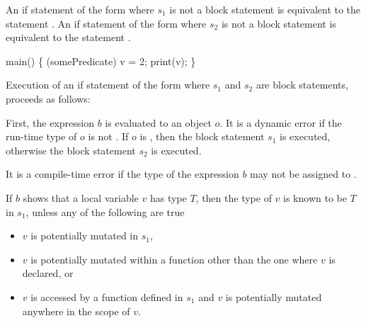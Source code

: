 \documentclass[makeidx]{article}
\begin{document}
{\LMHash{}%
An if statement of the form
where $s_1$ is not a block statement is equivalent to the statement
.
An if statement of the form
where $s_2$ is not a block statement is equivalent to the statement
.


\begin{dartCode}
\VOID{} main() \{
  \IF{} (somePredicate)
    \VAR{} v = 2;
  print(v);
\}
\end{dartCode}


\LMHash{}%
Execution of an if statement of the form
where $s_1$ and $s_2$ are block statements,
proceeds as follows:

\LMHash{}%
First, the expression $b$ is evaluated to an object $o$.
It is a dynamic error if the run-time type of $o$ is not .
If $o$ is \TRUE, then the block statement $s_1$ is executed,
otherwise the block statement $s_2$ is executed.

\LMHash{}%
It is a compile-time error if the type of the expression $b$
may not be assigned to .

\LMHash{}%
If $b$ shows that a local variable $v$ has type $T$,
then the type of $v$ is known to be $T$ in $s_1$,
unless any of the following are true
\begin{itemize}
\item $v$ is potentially mutated in $s_1$,
\item $v$ is potentially mutated within a function other
  than the one where $v$ is declared, or
\item $v$ is accessed by a function defined in $s_1$ and
  $v$ is potentially mutated anywhere in the scope of $v$.
\end{itemize}

}
\end{document}
